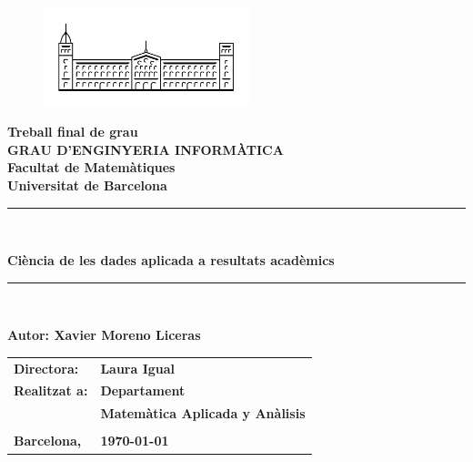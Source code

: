 \documentclass[12pt,a4paper,catalan]{article}
\newcommand{\titleTFG}{Ciència de les dades aplicada a resultats acadèmics}
\newcommand{\myname}{Xavier Moreno Liceras}
\begin{document}
\thispagestyle{empty}

\begin{titlepage}
\begin{center}
\begin{figure}[h]
\begin{center}
\includegraphics[width=6cm]{img/ub.png}
\end{center}
\end{figure}

\textbf{\LARGE Treball final de grau} \\
\vspace*{.5cm}
\textbf{\LARGE GRAU D'ENGINYERIA INFORMÀTICA } \\
\vspace*{.5cm}
\textbf{\LARGE Facultat de Matemàtiques \\ Universitat de Barcelona} \\
\vspace*{1.5cm}
\rule{\textwidth}{0.1mm}\\
\begin{Huge}
\textbf{\titleTFG} \\
\end{Huge}
\rule{\textwidth}{0.1mm}\\

\vspace{1cm}

\begin{flushright}
\textbf{\LARGE Autor: \myname}

\vspace*{2cm}

\renewcommand{\arraystretch}{1.5}
\begin{tabular}{ll}
\textbf{\Large Directora:} & \textbf{\Large Laura Igual } \\
\textbf{\Large Realitzat a:} & \textbf{\Large  Departament   } \\
 & \textbf{\Large Matemàtica Aplicada y Anàlisis} \\
\\
\textbf{\Large Barcelona,} & \textbf{\Large \today }
\end{tabular}

\end{flushright}

\end{center}
\end{titlepage}
\end{document}
